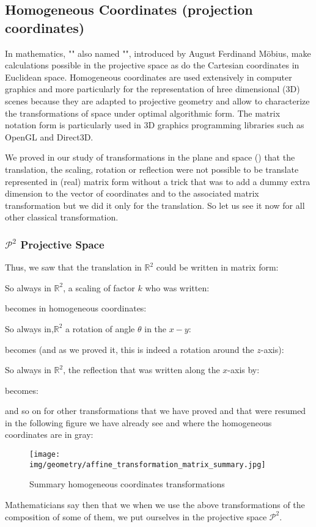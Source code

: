 	\subsection{Homogeneous Coordinates (projection coordinates)}
	In mathematics, "\label{homogeneous coordinates}" also named "", introduced by August Ferdinand Möbius, make calculations possible in the projective space as do the Cartesian coordinates in Euclidean space. Homogeneous coordinates are used extensively in computer graphics and more particularly for the representation of hree dimensional (3D) scenes  because they are adapted to projective geometry and allow to characterize the transformations of space under optimal algorithmic form. The matrix notation form is particularly used in 3D graphics programming  libraries such as OpenGL and Direct3D.

	We proved in our study of transformations in the plane and space () that the translation, the scaling, rotation or reflection were not possible to be translate represented in (real) matrix form without a trick that was to add a dummy extra dimension to the vector of coordinates and to the associated matrix transformation but we did it only for the translation. So let us see it now for all other classical transformation.
	
	\subsubsection{$\mathcal{P}^2$ Projective Space}
	Thus, we saw that the translation in $\mathbb{R}^2$ could be written in matrix form:
	
	So always in $\mathbb{R}^2$, a scaling of factor $k$ who was written:
	
	becomes in homogeneous coordinates:
	
	So always in,$\mathbb{R}^2$ a rotation of angle $\theta$ in the $x-y$:
	
	becomes (and as we proved it, this is indeed a rotation around the $z$-axis):
	
	So always in $\mathbb{R}^2$, the reflection that was written along the $x$-axis by:
	
	becomes:
	
	and so on for other transformations that we have proved and that were resumed in the following figure we have already see and where the homogeneous coordinates are in gray:
	\begin{figure}[H]
		\centering
		\texttt{[image: img/geometry/affine\_transformation\_matrix\_summary.jpg]}
		\caption{Summary homogeneous coordinates transformations}
	\end{figure}
	Mathematicians say then that we when we use the above transformations of the composition of some of them, we put ourselves in the projective space $\mathcal{P}^2$.
	
